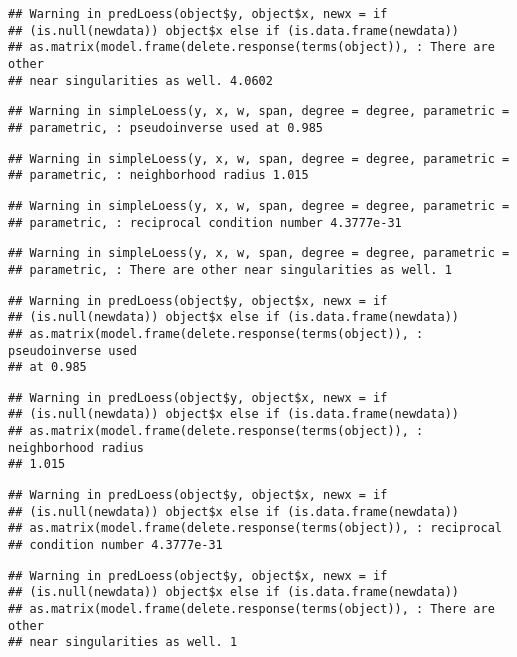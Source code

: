 \documentclass[]{article}
\begin{document}
\begin{verbatim}
## Warning in predLoess(object$y, object$x, newx = if
## (is.null(newdata)) object$x else if (is.data.frame(newdata))
## as.matrix(model.frame(delete.response(terms(object)), : There are other
## near singularities as well. 4.0602
\end{verbatim}

\begin{verbatim}
## Warning in simpleLoess(y, x, w, span, degree = degree, parametric =
## parametric, : pseudoinverse used at 0.985
\end{verbatim}

\begin{verbatim}
## Warning in simpleLoess(y, x, w, span, degree = degree, parametric =
## parametric, : neighborhood radius 1.015
\end{verbatim}

\begin{verbatim}
## Warning in simpleLoess(y, x, w, span, degree = degree, parametric =
## parametric, : reciprocal condition number 4.3777e-31
\end{verbatim}

\begin{verbatim}
## Warning in simpleLoess(y, x, w, span, degree = degree, parametric =
## parametric, : There are other near singularities as well. 1
\end{verbatim}

\begin{verbatim}
## Warning in predLoess(object$y, object$x, newx = if
## (is.null(newdata)) object$x else if (is.data.frame(newdata))
## as.matrix(model.frame(delete.response(terms(object)), : pseudoinverse used
## at 0.985
\end{verbatim}

\begin{verbatim}
## Warning in predLoess(object$y, object$x, newx = if
## (is.null(newdata)) object$x else if (is.data.frame(newdata))
## as.matrix(model.frame(delete.response(terms(object)), : neighborhood radius
## 1.015
\end{verbatim}

\begin{verbatim}
## Warning in predLoess(object$y, object$x, newx = if
## (is.null(newdata)) object$x else if (is.data.frame(newdata))
## as.matrix(model.frame(delete.response(terms(object)), : reciprocal
## condition number 4.3777e-31
\end{verbatim}

\begin{verbatim}
## Warning in predLoess(object$y, object$x, newx = if
## (is.null(newdata)) object$x else if (is.data.frame(newdata))
## as.matrix(model.frame(delete.response(terms(object)), : There are other
## near singularities as well. 1
\end{verbatim}
\end{document}
